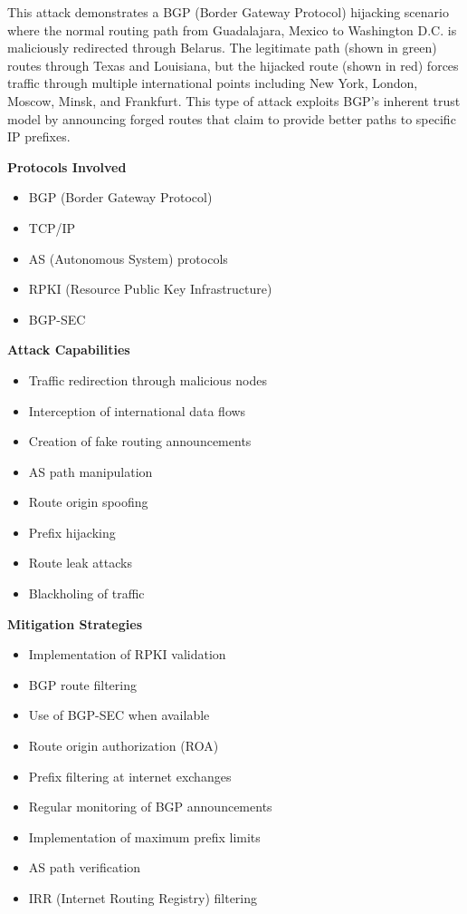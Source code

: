 This attack demonstrates a BGP (Border Gateway Protocol) hijacking scenario where the normal routing path from Guadalajara, Mexico to Washington D.C. is maliciously redirected through Belarus. The legitimate path (shown in green) routes through Texas and Louisiana, but the hijacked route (shown in red) forces traffic through multiple international points including New York, London, Moscow, Minsk, and Frankfurt. This type of attack exploits BGP's inherent trust model by announcing forged routes that claim to provide better paths to specific IP prefixes.

\textbf{Protocols Involved}
\begin{itemize}
    \item BGP (Border Gateway Protocol)
    \item TCP/IP
    \item AS (Autonomous System) protocols
    \item RPKI (Resource Public Key Infrastructure)
    \item BGP-SEC
\end{itemize}

\textbf{Attack Capabilities}
\begin{itemize}
    \item Traffic redirection through malicious nodes
    \item Interception of international data flows
    \item Creation of fake routing announcements
    \item AS path manipulation
    \item Route origin spoofing
    \item Prefix hijacking
    \item Route leak attacks
    \item Blackholing of traffic
\end{itemize}

\textbf{Mitigation Strategies}
\begin{itemize}
    \item Implementation of RPKI validation
    \item BGP route filtering
    \item Use of BGP-SEC when available
    \item Route origin authorization (ROA)
    \item Prefix filtering at internet exchanges
    \item Regular monitoring of BGP announcements
    \item Implementation of maximum prefix limits
    \item AS path verification
    \item IRR (Internet Routing Registry) filtering
\end{itemize}

